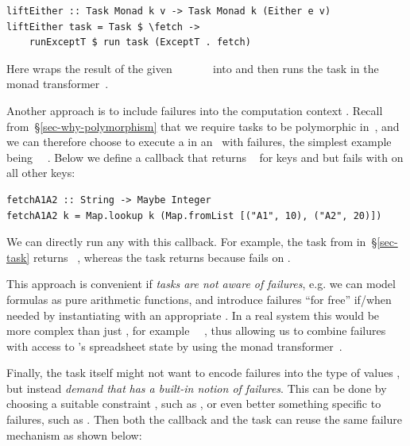\vspace{1mm}
\begin{verbatim}
liftEither :: Task Monad k v -> Task Monad k (Either e v)
liftEither task = Task $ \fetch ->
    runExceptT $ run task (ExceptT . fetch)
\end{verbatim}
\vspace{1mm}

\noindent
Here  wraps the result of the given
~\hs{::}~~\hs{->}~~~ into 
and then runs the task in the  monad
transformer~\cite{liang1995monad}.

Another approach is to include failures into the computation context .
Recall from~\S\ref{sec-why-polymorphism} that we require tasks to be polymorphic
in~, and we can therefore choose to execute a  in an~ with
failures, the simplest example being ~\hs{=}~. Below we define
a callback  that returns ~ for keys 
and  but fails with  on all other keys:

\vspace{1mm}
\begin{verbatim}
fetchA1A2 :: String -> Maybe Integer
fetchA1A2 k = Map.lookup k (Map.fromList [("A1", 10), ("A2", 20)])
\end{verbatim}
\vspace{1mm}

\noindent
We can directly run any  with this callback. For example, the task
 from  in~\S\ref{sec-task} returns
~, whereas the task  returns 
because  fails on .

This approach is convenient if \emph{tasks are not aware of failures}, e.g. we
can model \Excel formulas as pure arithmetic functions, and introduce failures
``for free'' if/when needed by instantiating  with an appropriate
. In a real system this  would be more complex than just ,
for example ~~, thus allowing us to
combine failures with access to \Excel's spreadsheet state by using the
 monad transformer~\cite{liang1995monad}.

Finally, the task itself might not want to encode failures into the type of
values , but instead \emph{demand that}  \emph{has a built-in notion
of failures}. This can be done by choosing a suitable constraint , such as
,  or even better something specific to failures,
such as . Then both the callback and the task can reuse the same
failure mechanism as shown below:

